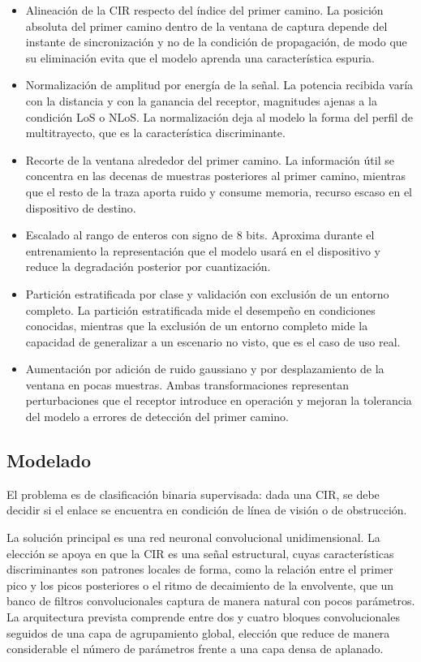 \documentclass[
11pt, %
]{charter}
\begin{document}
\begin{itemize}
    \item Alineación de la CIR respecto del índice del primer camino. La posición absoluta del primer camino dentro de la ventana de captura depende del instante de sincronización y no de la condición de propagación, de modo que su eliminación evita que el modelo aprenda una característica espuria.
    \item Normalización de amplitud por energía de la señal. La potencia recibida varía con la distancia y con la ganancia del receptor, magnitudes ajenas a la condición LoS o NLoS. La normalización deja al modelo la forma del perfil de multitrayecto, que es la característica discriminante.
    \item Recorte de la ventana alrededor del primer camino. La información útil se concentra en las decenas de muestras posteriores al primer camino, mientras que el resto de la traza aporta ruido y consume memoria, recurso escaso en el dispositivo de destino.
    \item Escalado al rango de enteros con signo de 8 bits. Aproxima durante el entrenamiento la representación que el modelo usará en el dispositivo y reduce la degradación posterior por cuantización.
    \item Partición estratificada por clase y validación con exclusión de un entorno completo. La partición estratificada mide el desempeño en condiciones conocidas, mientras que la exclusión de un entorno completo mide la capacidad de generalizar a un escenario no visto, que es el caso de uso real.
    \item Aumentación por adición de ruido gaussiano y por desplazamiento de la ventana en pocas muestras. Ambas transformaciones representan perturbaciones que el receptor introduce en operación y mejoran la tolerancia del modelo a errores de detección del primer camino.
\end{itemize}

\subsection{Modelado}

El problema es de clasificación binaria supervisada: dada una CIR, se debe decidir si el enlace se encuentra en condición de línea de visión o de obstrucción.

La solución principal es una red neuronal convolucional unidimensional. La elección se apoya en que la CIR es una señal estructural, cuyas características discriminantes son patrones locales de forma, como la relación entre el primer pico y los picos posteriores o el ritmo de decaimiento de la envolvente, que un banco de filtros convolucionales captura de manera natural con pocos parámetros. La arquitectura prevista comprende entre dos y cuatro bloques convolucionales seguidos de una capa de agrupamiento global, elección que reduce de manera considerable el número de parámetros frente a una capa densa de aplanado.
\end{document}
